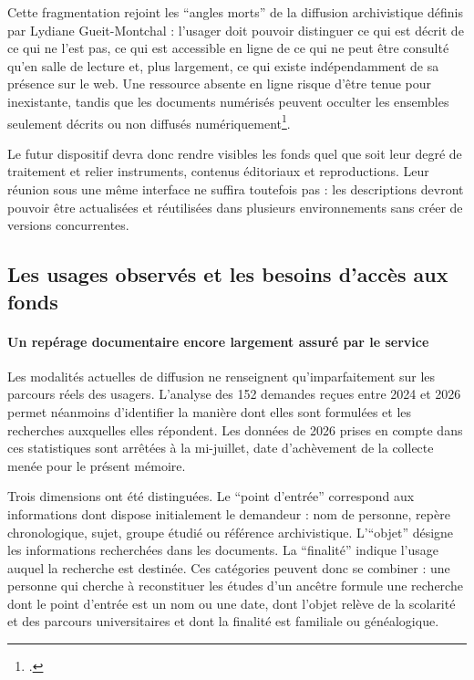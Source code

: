 Cette fragmentation rejoint les \enquote{angles morts} de la diffusion archivistique définis par Lydiane Gueit-Montchal : l'usager doit pouvoir distinguer ce qui est décrit de ce qui ne l'est pas, ce qui est accessible en ligne de ce qui ne peut être consulté qu'en salle de lecture et, plus largement, ce qui existe indépendamment de sa présence sur le web. Une ressource absente en ligne risque d'être tenue pour inexistante, tandis que les documents numérisés peuvent occulter les ensembles seulement décrits ou non diffusés numériquement\footcite[p.~14]{GueitMontchal2021}.

Le futur dispositif devra donc rendre visibles les fonds quel que soit leur degré de traitement et relier instruments, contenus éditoriaux et reproductions. Leur réunion sous une même interface ne suffira toutefois pas : les descriptions devront pouvoir être actualisées et réutilisées dans plusieurs environnements sans créer de versions concurrentes.

\subsection{Les usages observés et les besoins d'accès aux fonds}
\label{subsec:acces-documents-fonds}

\paragraph{Un repérage documentaire encore largement assuré par le service}

Les modalités actuelles de diffusion ne renseignent qu'imparfaitement sur les parcours réels des usagers. L'analyse des 152 demandes reçues entre 2024 et 2026 permet néanmoins d'identifier la manière dont elles sont formulées et les recherches auxquelles elles répondent. Les données de 2026 prises en compte dans ces statistiques sont arrêtées à la mi-juillet, date d'achèvement de la collecte menée pour le présent mémoire.

Trois dimensions ont été distinguées. Le \enquote{point d'entrée} correspond aux informations dont dispose initialement le demandeur : nom de personne, repère chronologique, sujet, groupe étudié ou référence archivistique. L'\enquote{objet} désigne les informations recherchées dans les documents. La \enquote{finalité} indique l'usage auquel la recherche est destinée. Ces catégories peuvent donc se combiner : une personne qui cherche à reconstituer les études d'un ancêtre formule une recherche dont le point d'entrée est un nom ou une date, dont l'objet relève de la scolarité et des parcours universitaires et dont la finalité est familiale ou généalogique.

